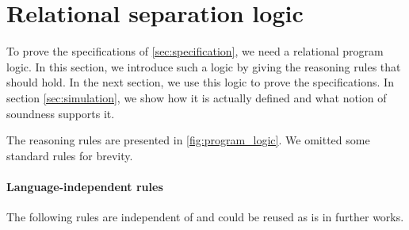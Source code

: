 \section{Relational separation logic}
\label{sec:program_logic}


%
%
%


To prove the specifications of \cref{sec:specification}, we need a relational program logic.
In this section, we introduce such a logic by giving the reasoning rules that should hold.
In the next section, we use this logic to prove the specifications.
In section \cref{sec:simulation}, we show how it is actually defined and what notion of soundness supports it.

The reasoning rules are presented in \cref{fig:program_logic}.
We omitted some standard rules for brevity.

\paragraph{Language-independent rules}
The following rules are independent of \DataLang and could be reused as is in further works.

